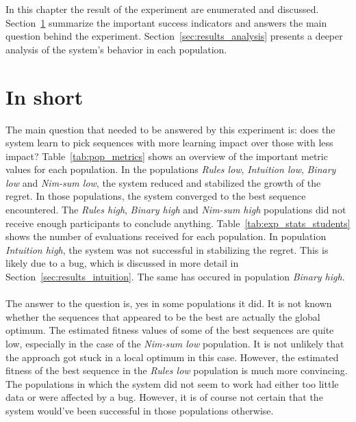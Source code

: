In this chapter the result of the experiment are enumerated and discussed.
Section~\ref{sec:results_short} summarize the important success indicators and
answers the main question behind the experiment.
Section~\ref{sec:results_analysis} presents a deeper analysis of the system's
behavior in each population.


\section{In short}
\label{sec:results_short}
The main question that needed to be answered by this experiment is: does the
system learn to pick sequences with more learning impact over those with less
impact? Table~\ref{tab:pop_metrics} shows an overview of the important metric values
for each population. In the populations \emph{Rules low}, \emph{Intuition low},
\emph{Binary low} and \emph{Nim-sum low}, the system reduced and stabilized the
growth of the regret. In those populations, the system converged to the best
sequence encountered. The \emph{Rules high}, \emph{Binary high} and
\emph{Nim-sum high} populations did not receive enough participants to conclude
anything. Table~\ref{tab:exp_stats_students} shows the number of evaluations
received for each population. In population \emph{Intuition high}, the system
was not successful in stabilizing the regret. This is likely due to a bug,
which is discussed in more detail in Section~\ref{sec:results_intuition}. The
same has occured in population \emph{Binary high}.\\\\
\noindent
The answer to the question is, yes in some populations it did. It is not known
whether the sequences that appeared to be the best are actually the global
optimum. The estimated fitness values of some of the best sequences are quite
low, especially in the case of the \emph{Nim-sum low} population. It is not
unlikely that the approach got stuck in a local optimum in this case. However,
the estimated fitness of the best sequence in the \emph{Rules low} population
is much more convincing. The populations in which the system did not seem to
work had either too little data or were affected by a bug. However, it is of
course not certain that the system would've been successful in those
populations otherwise.

